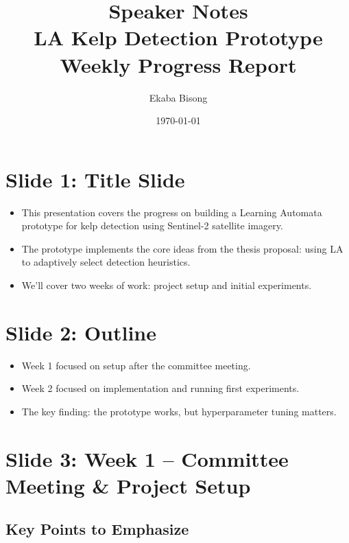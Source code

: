 \documentclass[11pt]{article}
\title{\textbf{Speaker Notes}\\LA Kelp Detection Prototype\\Weekly Progress Report}
\author{Ekaba Bisong}
\date{\today}
\newenvironment{talkingpoints}{%
  \begin{itemize}[leftmargin=1.5em, itemsep=0.3em]
}{%
  \end{itemize}
}
\begin{document}
\maketitle
\tableofcontents
\newpage

\section{Slide 1: Title Slide}

\begin{talkingpoints}
  \item This presentation covers the progress on building a Learning Automata prototype for kelp detection using Sentinel-2 satellite imagery.
  \item The prototype implements the core ideas from the thesis proposal: using LA to adaptively select detection heuristics.
  \item We'll cover two weeks of work: project setup and initial experiments.
\end{talkingpoints}

\section{Slide 2: Outline}

\begin{talkingpoints}
  \item Week 1 focused on setup after the committee meeting.
  \item Week 2 focused on implementation and running first experiments.
  \item The key finding: the prototype works, but hyperparameter tuning matters.
\end{talkingpoints}

\section{Slide 3: Week 1 -- Committee Meeting \& Project Setup}

\subsection{Key Points to Emphasize}
\end{document}
